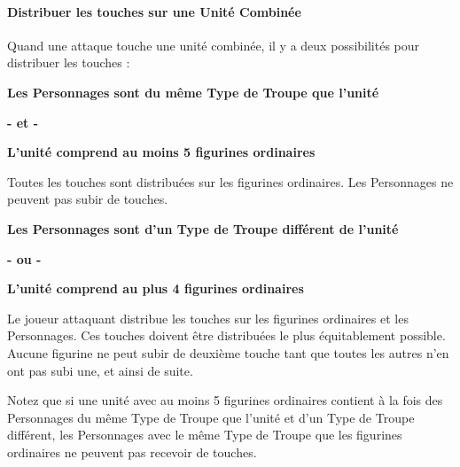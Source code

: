 \paragraph{Distribuer les touches sur une Unité Combinée}
\label{distributing_hits_at_combined_units}

Quand une attaque touche une unité combinée, il y a deux possibilités pour distribuer les touches :

\setlength\columnseprule{0.5pt}
\begin{multicols}{2}\raggedcolumns

\noindent
\begin{center}\textbf{Les Personnages sont du même Type de Troupe que l'unité}\end{center}
\begin{center}\textbf{- et -}\end{center}
\begin{center}\textbf{L'unité comprend au moins 5 figurines ordinaires}\end{center}

\noindent Toutes les touches sont distribuées sur les figurines ordinaires. Les Personnages ne peuvent pas subir de touches.

\columnbreak

\noindent
\begin{center}\textbf{Les Personnages sont d'un Type de Troupe différent de l'unité}\end{center}
\begin{center}\textbf{- ou -}\end{center}
\begin{center}\textbf{L'unité comprend au plus 4 figurines ordinaires}\end{center}

\noindent Le joueur attaquant distribue les touches sur les figurines ordinaires et les Personnages. Ces touches doivent être distribuées le plus équitablement possible. Aucune figurine ne peut subir de deuxième touche tant que toutes les autres n'en ont pas subi une, et ainsi de suite.

\end{multicols}
\setlength\columnseprule{0pt}

Notez que si une unité avec au moins 5 figurines ordinaires contient à la fois des Personnages du même Type de Troupe que l'unité et d'un Type de Troupe différent, les Personnages avec le même Type de Troupe que les figurines ordinaires ne peuvent pas recevoir de touches.

